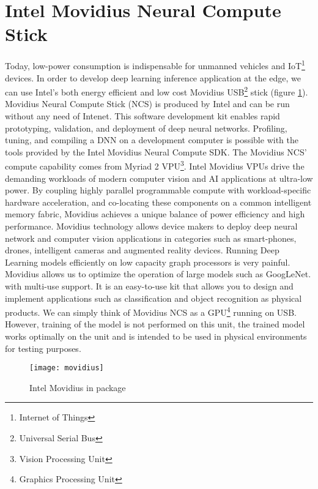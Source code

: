 \section{Intel Movidius Neural Compute Stick}
\label{sec:movidius}
Today, low-power consumption is indispensable for unmanned vehicles and 
IoT\footnote{Internet of Things} devices.
In order to develop deep learning inference application at the edge, we can use 
Intel’s both energy efficient and low cost Movidius 
USB\footnote{Universal Serial Bus} stick (figure \ref{fig:movidius}).
Movidius Neural Compute Stick (NCS) is produced by Intel and can be run 
without any need of Intenet. 
This software development kit enables rapid prototyping, validation, and 
deployment of deep neural networks. 
Profiling, tuning, and compiling a DNN on a development computer is possible 
with the tools provided by the Intel Movidius Neural Compute SDK.
The Movidius NCS’ compute capability comes from Myriad 2 VPU\footnote{Vision Processing Unit}.
Intel Movidius VPUs drive the demanding workloads of modern computer vision 
and AI applications at ultra-low power. 
By coupling highly parallel programmable compute with workload-specific hardware 
acceleration, and co-locating these components on a common intelligent memory 
fabric, Movidius achieves a unique balance of power efficiency and high performance. 
Movidius technology allows device makers to deploy deep neural network and 
computer vision applications in categories such as smart-phones, drones, 
intelligent cameras and augmented reality devices.
Running Deep Learning models efficiently on low capacity graph processors is 
very painful. 
Movidius allows us to optimize the operation of large models such as GoogLeNet.
with multi-use support.
It is an easy-to-use kit that allows you to design and implement applications 
such as classification and object recognition as physical products.
We can simply think of Movidius NCS as a GPU\footnote{Graphics Processing Unit} 
running on USB. 
However, training of the model is not performed on this unit, the trained model 
works optimally on the unit and is intended to be used in physical environments 
for testing purposes.
%
\begin{figure}[htb]
\centering
\texttt{[image: movidius]}
\caption{Intel Movidius in package}
\label{fig:movidius}
\end{figure}
%
